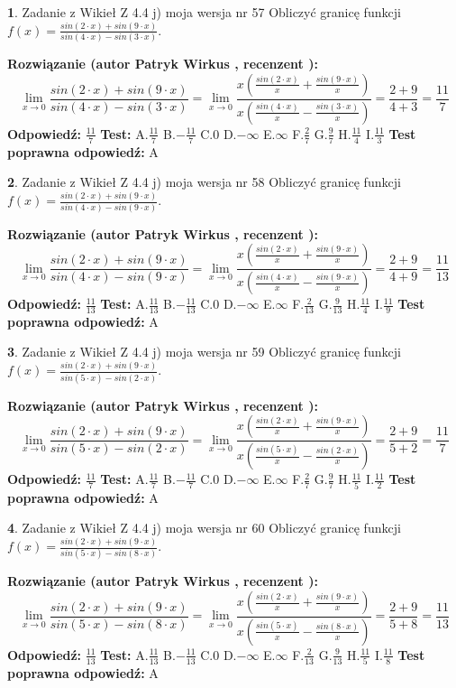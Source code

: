 \documentclass[12pt, a4paper]{article}
\theoremstyle{definition} %
\newtheorem{zad}{}
\newcommand{\zadStart}[1]{\begin{zad}#1\newline}
\newcommand{\zadStop}{\end{zad}}
\newcommand{\rozwStart}[2]{\noindent \textbf{Rozwiązanie (autor #1 , recenzent #2): }\newline}
\newcommand{\rozwStop}{\newline}
\newcommand{\odpStart}{\noindent \textbf{Odpowiedź:}\newline}
\newcommand{\odpStop}{\newline}
\newcommand{\testStart}{\noindent \textbf{Test:}\newline}
\newcommand{\testStop}{\newline}
\newcommand{\kluczStart}{\noindent \textbf{Test poprawna odpowiedź:}\newline}
\newcommand{\kluczStop}{\newline}
\begin{document}
\zadStart{Zadanie z Wikieł Z 4.4 j) moja wersja nr 57}
Obliczyć granicę funkcji $f(x)=\frac{sin(2\cdot x) +sin(9\cdot x)}{sin(4\cdot x) -sin(3\cdot x)}$.
\zadStop
\rozwStart{Patryk Wirkus}{}
$$\lim\limits_{x\to 0}\frac{sin(2\cdot x) +sin(9\cdot x)}{sin(4\cdot x) -sin(3\cdot x)}=\lim\limits_{x\to 0}\frac{x(\frac{sin(2\cdot x)}{x}+\frac{sin(9\cdot x)}{x})}{x(\frac{sin(4\cdot x)}{x}-\frac{sin(3\cdot x)}{x})}=\frac{2+9}{4+3} = \frac{11}{7}$$
\rozwStop
\odpStart
$\frac{11}{7}$
\odpStop
\testStart
A.$\frac{11}{7}$
B.$-\frac{11}{7}$
C.$0$
D.$-\infty$
E.$\infty$
F.$\frac{2}{7}$
G.$\frac{9}{7}$
H.$\frac{11}{4}$
I.$\frac{11}{3}$
\testStop
\kluczStart
A
\kluczStop



\zadStart{Zadanie z Wikieł Z 4.4 j) moja wersja nr 58}
Obliczyć granicę funkcji $f(x)=\frac{sin(2\cdot x) +sin(9\cdot x)}{sin(4\cdot x) -sin(9\cdot x)}$.
\zadStop
\rozwStart{Patryk Wirkus}{}
$$\lim\limits_{x\to 0}\frac{sin(2\cdot x) +sin(9\cdot x)}{sin(4\cdot x) -sin(9\cdot x)}=\lim\limits_{x\to 0}\frac{x(\frac{sin(2\cdot x)}{x}+\frac{sin(9\cdot x)}{x})}{x(\frac{sin(4\cdot x)}{x}-\frac{sin(9\cdot x)}{x})}=\frac{2+9}{4+9} = \frac{11}{13}$$
\rozwStop
\odpStart
$\frac{11}{13}$
\odpStop
\testStart
A.$\frac{11}{13}$
B.$-\frac{11}{13}$
C.$0$
D.$-\infty$
E.$\infty$
F.$\frac{2}{13}$
G.$\frac{9}{13}$
H.$\frac{11}{4}$
I.$\frac{11}{9}$
\testStop
\kluczStart
A
\kluczStop



\zadStart{Zadanie z Wikieł Z 4.4 j) moja wersja nr 59}
Obliczyć granicę funkcji $f(x)=\frac{sin(2\cdot x) +sin(9\cdot x)}{sin(5\cdot x) -sin(2\cdot x)}$.
\zadStop
\rozwStart{Patryk Wirkus}{}
$$\lim\limits_{x\to 0}\frac{sin(2\cdot x) +sin(9\cdot x)}{sin(5\cdot x) -sin(2\cdot x)}=\lim\limits_{x\to 0}\frac{x(\frac{sin(2\cdot x)}{x}+\frac{sin(9\cdot x)}{x})}{x(\frac{sin(5\cdot x)}{x}-\frac{sin(2\cdot x)}{x})}=\frac{2+9}{5+2} = \frac{11}{7}$$
\rozwStop
\odpStart
$\frac{11}{7}$
\odpStop
\testStart
A.$\frac{11}{7}$
B.$-\frac{11}{7}$
C.$0$
D.$-\infty$
E.$\infty$
F.$\frac{2}{7}$
G.$\frac{9}{7}$
H.$\frac{11}{5}$
I.$\frac{11}{2}$
\testStop
\kluczStart
A
\kluczStop



\zadStart{Zadanie z Wikieł Z 4.4 j) moja wersja nr 60}
Obliczyć granicę funkcji $f(x)=\frac{sin(2\cdot x) +sin(9\cdot x)}{sin(5\cdot x) -sin(8\cdot x)}$.
\zadStop
\rozwStart{Patryk Wirkus}{}
$$\lim\limits_{x\to 0}\frac{sin(2\cdot x) +sin(9\cdot x)}{sin(5\cdot x) -sin(8\cdot x)}=\lim\limits_{x\to 0}\frac{x(\frac{sin(2\cdot x)}{x}+\frac{sin(9\cdot x)}{x})}{x(\frac{sin(5\cdot x)}{x}-\frac{sin(8\cdot x)}{x})}=\frac{2+9}{5+8} = \frac{11}{13}$$
\rozwStop
\odpStart
$\frac{11}{13}$
\odpStop
\testStart
A.$\frac{11}{13}$
B.$-\frac{11}{13}$
C.$0$
D.$-\infty$
E.$\infty$
F.$\frac{2}{13}$
G.$\frac{9}{13}$
H.$\frac{11}{5}$
I.$\frac{11}{8}$
\testStop
\kluczStart
A
\kluczStop
\end{document}

